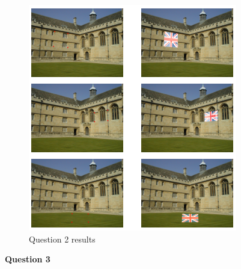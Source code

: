 \documentclass[11pt]{article}
\begin{document}
\begin{figure}
    \centering
    \includegraphics[width=\textwidth]{Images/2.png}
    \caption{Question 2 results}
    \label{Q2}
\end{figure}

\noindent \textbf{Question 3}
\end{document}
